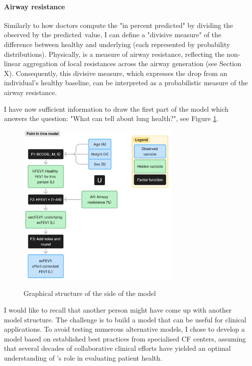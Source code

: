 \paragraph{Airway resistance}
Similarly to how doctors compute the "\F in percent predicted" by dividing the observed \F by the predicted\ value, I can define a "divisive measure" of the difference between healthy and underlying \F (each represented by probability distributions). Physically, \F is a measure of airway resistance, reflecting the non-linear aggregation of local resistances across the airway generation (see Section X). Consequently, this divisive measure, which expresses the drop from an individual's healthy \F baseline, can be interpreted as a probabilistic measure of the airway resistance.

I have now sufficient information to draw the first part of the model which answers the question: "What can \F tell about lung health?", see Figure \ref{graph:fev1_side}.

\begin{figure}[!h]
    \caption{Graphical structure of the \F side of the model}
    \centering
    \includegraphics[width=80mm]{Chapter1/Figs/fev1_side_model_structure.png}
    \label{graph:fev1_side}
\end{figure}

I would like to recall that another person might have come up with another model structure. The challenge is to build a model that can be useful for clinical applications. To avoid testing numerous alternative models, I chose to develop a model based on established best practices from specialised CF centers, assuming that several decades of collaborative clinical efforts have yielded an optimal understanding of \F’s role in evaluating patient health.

